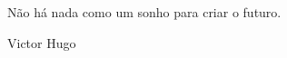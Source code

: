 
\null{}
\vfill{}
\begin{flushright}
    \begin{minipage}{9.0cm}
        Não há nada como um sonho para criar o futuro.
    \end{minipage}
\end{flushright}

\begin{flushright}
    Victor Hugo
\end{flushright}

\cleardoublepage{}
